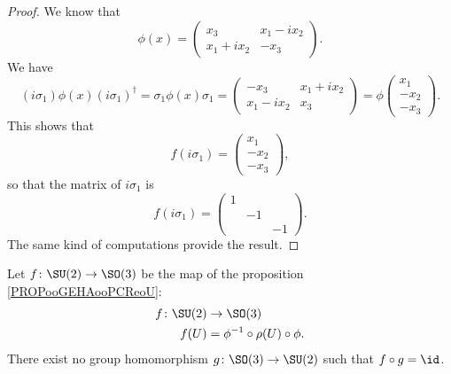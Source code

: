 \begin{proof}
    We know that 
    \begin{equation}
        \phi(x)=\begin{pmatrix}
            x_3    &   x_1-ix_2    \\ 
            x_1+ix_2    &   -x_3    
        \end{pmatrix}.
    \end{equation}
    We have
    \begin{equation}
        (i\sigma_1)\phi(x)(i\sigma_1)^{\dag}=\sigma_1\phi(x)\sigma_1=\begin{pmatrix}
            -x_3    &   x_1+ix_2    \\ 
            x_1-ix_2    &   x_3    
        \end{pmatrix}=\phi\begin{pmatrix}
            x_1    \\ 
            -x_2    \\ 
            -x_3    
        \end{pmatrix}.
    \end{equation}
    This shows that
    \begin{equation}
        f(i\sigma_1)=\begin{pmatrix}
            x_1    \\ 
            -x_2    \\ 
            -x_3    
        \end{pmatrix},
    \end{equation}
    so that the matrix of \( i\sigma_1\) is
    \begin{equation}
        f(i\sigma_1)=\begin{pmatrix}
            1    &       &       \\
                &   -1    &       \\
                &       &   -1
        \end{pmatrix}.
    \end{equation}
    The same kind of computations provide the result.
\end{proof}

\begin{proposition}
    Let \( f\colon \SU(2)\to \SO(3)\) be the map of the proposition \ref{PROPooGEHAooPCReoU}:
    \begin{equation}
        \begin{aligned}
            f\colon \SU(2)&\to \SO(3) \\
            f(U)&=\phi^{-1}\circ\rho(U)\circ \phi.
        \end{aligned}
    \end{equation}
    There exist no group homomorphism \( g\colon \SO(3)\to \SU(2)\) such that \( f\circ g=\id\).
\end{proposition}

